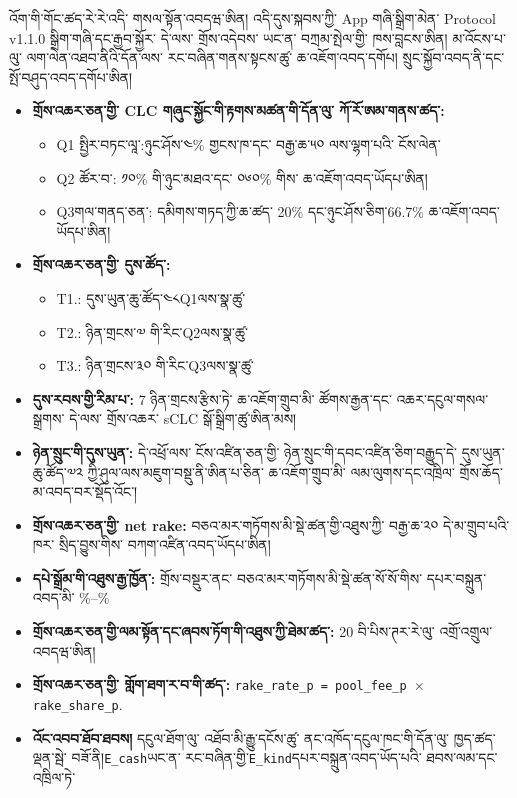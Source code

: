 \documentclass[11pt]{article}
\begin{document}
འོག་གི་གོང་ཚད་རེ་རེ་འདི་ གསལ་སྟོན་འབདཝ་ཨིན། འདི་དུས་སྐབས་ཀྱི་ App གཞི་སྒྲིག་མེན་ Protocol v1.1.0 སྒྲིག་གཞི་དང་རྒྱབ་སྐྱོར་ དེ་ལས་ གྲོས་འདེབས་ ཡང་ན་ བཀྲམ་སྤེལ་གྱི་ ཁས་བླངས་ཨིན། མ་འོངས་པ་ལུ་ ལག་ལེན་འཐབ་ནིའི་དོན་ལས་ རང་བཞིན་གནས་སྟངས་ཚུ་ ཆ་འཇོག་འབད་དགོཔ། སྲུང་སྐྱོབ་འབད་ནི་དང་ སྤོ་བཤུད་འབད་དགོཔ་ཨིན།

\begin{itemize}[leftmargin=*]
\item \textbf{གྲོས་འཆར་ཅན་གྱི་ CLC གཞུང་སྐྱོང་གི་རྟགས་མཚན་གི་དོན་ལུ་ ཀོ་རོ་ཨམ་གནས་ཚད་:}
\begin{itemize}[leftmargin=*]
\item Q1 སྤྱིར་བཏང་ལཱ་:ཉུང་ཤོས་༤\% གྱངས་ཁ་དང་ བརྒྱ་ཆ་༥༠ ལས་ལྷག་པའི་ ངོས་ལེན་
\item Q2 ཚོར་བ་: ༡༠\% གི་ཉུང་མཐའ་དང་ ༠༦༠\% གིས་ ཆ་འཇོག་འབད་ཡོདཔ་ཨིན།
\item Q3གལ་གནད་ཅན་: དམིགས་གཏད་ཀྱི་ཆ་ཚད་ 20\% དང་ཉུང་ཤོས་ཅིག་66.7\% ཆ་འཇོག་འབད་ཡོདཔ་ཨིན།
\end{itemize}
\item \textbf{གྲོས་འཆར་ཅན་གྱི་ དུས་ཚོད་:}
\begin{itemize}[leftmargin=*]
\item T1.: དུས་ཡུན་ཆུ་ཚོད་༤༨Q1ལས་སྣ་ཚུ་
\item T2.: ཉིན་གྲངས་༧ གི་རིང་Q2ལས་སྣ་ཚུ་
\item T3.: ཉིན་གྲངས་༣༠ གི་རིང་Q3ལས་སྣ་ཚུ་
\end{itemize}
\item \textbf{དུས་རབས་གྱི་རིམ་པ་:} 7 ཉིན་གྲངས་རྩིས་ཏེ་ ཆ་འཇོག་གྲུབ་མི་ ཚོགས་རྒྱན་དང་ འཆར་དངུལ་གསལ་སྒྲགས་ དེ་ལས་ གྲོས་འཆར་ sCLC སྒོ་སྒྲིག་ཚུ་ཨིན་མས།
\item \textbf{ཉེན་སྲུང་གི་དུས་ཡུན་:} དེ་འཕྲོ་ལས་ ངོས་འཛིན་ཅན་གྱི་ ཉེན་སྲུང་གི་དབང་འཛིན་ཅིག་བརྒྱུད་དེ་ དུས་ཡུན་ཆུ་ཚོད་༧༢ ཀྱི་ཤུལ་ལས་མཇུག་བསྡུ་ནི་ཨིན་པ་ཅིན་ ཆ་འཇོག་གྲུབ་མི་ ལམ་ལུགས་དང་འཁྲིལ་ གྲོས་ཆོད་མ་འབད་བར་སྡོད་འོང་།
\item \textbf{གྲོས་འཆར་ཅན་གྱི་ net rake:} བཅའ་མར་གཏོགས་མི་སྡེ་ཚན་གྱི་འཐུས་ཀྱི་ བརྒྱ་ཆ་༢༠ དེ་མ་གྲུབ་པའི་ཁར་ སྲིད་བྱུས་གིས་ བཀག་འཛིན་འབད་ཡོདཔ་ཨིན།
\item \textbf{དཔེ་སྒྲོམ་གི་འཐུས་རྒྱ་ཁྱོན་:} གྲོས་བསྡུར་ནང་ བཅའ་མར་གཏོགས་མི་སྡེ་ཚན་སོ་སོ་གིས་ དཔར་བསྐྲུན་འབད་མི་ \%--\%
\item \textbf{གྲོས་འཆར་ཅན་གྱི་ལམ་སྟོན་དང་ཞབས་ཏོག་གི་འཐུས་ཀྱི་ཐེམ་ཚད་:} 20 བི་པིས་ཊར་རེ་ལུ་ འགྲོ་འགྲུལ་འབདཝ་ཨིན།
\item \textbf{གྲོས་འཆར་ཅན་གྱི་ གློག་ཐག་ར་བ་གི་ཚད་:} \texttt{rake\_rate\_p = pool\_fee\_p $\times$ rake\_share\_p}.
\item \textbf{འོང་འབབ་ཐོབ་ཐབས།} དངུལ་ཐོག་ལུ་ འཐོབ་མི་རྒྱུ་དངོས་ཚུ་ ནང་འཁོད་དངུལ་ཁང་གི་དོན་ལུ་ ཁྱད་ཚད་ལྡན་སྦེ་ བཟོ་ནི།\texttt{E\_cash}ཡང་ན་ རང་བཞིན་གྱི་\texttt{E\_kind}དཔར་བསྐྲུན་འབད་ཡོད་པའི་ ཐབས་ལམ་དང་འཁྲིལ་ཏེ་

\end{itemize}
\end{document}
